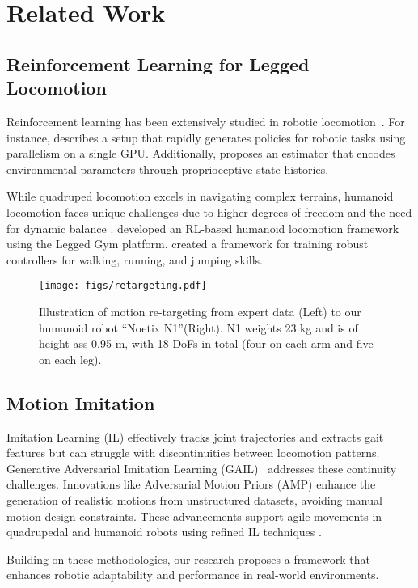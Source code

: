 \section{Related Work}
\label{sec:Related Work}
\subsection{Reinforcement Learning for Legged Locomotion}
Reinforcement learning has been extensively studied in robotic 
locomotion~\cite{hwangbo2019learning, miki2022learning}.%
For instance, \cite{rudin2022learning} describes a setup that rapidly generates policies for robotic tasks using parallelism on a single GPU. Additionally, \cite{nahrendra2023dreamwaq} proposes an estimator that encodes environmental parameters through proprioceptive state histories.

While quadruped locomotion excels in navigating complex terrains, 
humanoid locomotion faces unique challenges due to 
higher degrees of freedom and the need for dynamic balance \cite{article4}.
\cite{gu2024humanoidgym} developed an RL-based humanoid 
locomotion framework using the Legged Gym platform.
 \cite{li2024reinforcement} created a framework 
for training robust controllers for walking, 
running, and jumping skills. 

\begin{figure}[t]
        \centering
        \texttt{[image: figs/retargeting.pdf]}
        \caption{ \small 
        Illustration of motion re-targeting from expert data (Left) to 
        our humanoid robot ``Noetix N1''(Right). 
        N1 weights 23 kg and is of height ass 0.95 m, with 18 DoFs in total (four on each arm and five on each leg).
        }
        \label{fig:retarget}
        \vspace{-6mm}
\end{figure}

\subsection{Motion Imitation}
\tonghe{ 
}
Imitation Learning (IL) effectively tracks joint trajectories and extracts gait features but can struggle with discontinuities between locomotion patterns.
Generative Adversarial Imitation Learning (GAIL)~\cite{ho2016generative} addresses these continuity challenges. 
Innovations like Adversarial Motion Priors (AMP) enhance the generation of realistic motions from unstructured datasets, 
avoiding manual motion design constraints. 
These advancements support agile movements in quadrupedal and humanoid robots using refined 
IL techniques \cite{tang2024humanmimic,wu2023learning, zhang2024whole}.

Building on these methodologies, our research proposes a framework that enhances robotic adaptability and performance in real-world environments.